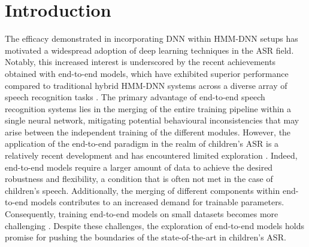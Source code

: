 \label{chap:4}
\cleardoublepage
\section{Introduction}
The efficacy demonstrated in incorporating \ac{DNN} within \ac{HMM-DNN} setups has motivated a widespread adoption of deep learning techniques in the \ac{ASR} field. Notably, this increased interest is underscored by the recent achievements obtained with end-to-end models, which have exhibited superior performance compared to traditional hybrid \ac{HMM-DNN} systems across a diverse array of speech recognition tasks \cite{zeyer2019comparison,zeineldeen2022Conformer}.
The primary advantage of end-to-end speech recognition systems lies in the merging of the entire training pipeline within a single neural network, mitigating potential behavioural inconsistencies that may arise between the independent training of the different modules.
However, the application of the end-to-end paradigm in the realm of children's \ac{ASR} is a relatively recent development and has encountered limited exploration \cite{gelin2021endtoend,sri_end2end,chen2020data,ng2020cuhk}. Indeed, end-to-end models require a larger amount of data to achieve the desired robustness and flexibility, a condition that is often not met in the case of children's speech. Additionally, the merging of different components within end-to-end models contributes to an increased demand for trainable parameters. Consequently, training end-to-end models on small datasets becomes more challenging \cite{luscher2019rwth}. Despite these challenges, the exploration of end-to-end models holds promise for pushing the boundaries of the state-of-the-art in children's \ac{ASR}.



